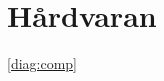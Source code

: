 \documentclass[main.tex]{subfiles}
\begin{document}
\section{Hårdvaran}
\ref{diag:comp}




\end{document}
